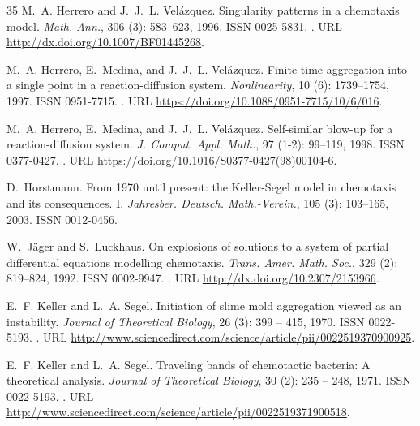 \documentclass[11pt]{aims}
\theoremstyle{definition}
\numberwithin{equation}{section}
\begin{document}
\begin{thebibliography}{35}
M.~A. Herrero and J.~J.~L. Vel{\'a}zquez.
\newblock Singularity patterns in a chemotaxis model.
\newblock \emph{Math. Ann.}, 306 (3): 583--623, 1996.
\newblock ISSN 0025-5831.
\newblock {}.
\newblock URL \url{http://dx.doi.org/10.1007/BF01445268}.

M.~A. Herrero, E.~Medina, and J.~J.~L. Vel\'{a}zquez.
\newblock Finite-time aggregation into a single point in a reaction-diffusion
  system.
\newblock \emph{Nonlinearity}, 10 (6): 1739--1754, 1997.
\newblock ISSN 0951-7715.
\newblock {}.
\newblock URL \url{https://doi.org/10.1088/0951-7715/10/6/016}.

M.~A. Herrero, E.~Medina, and J.~J.~L. Vel\'{a}zquez.
\newblock Self-similar blow-up for a reaction-diffusion system.
\newblock \emph{J. Comput. Appl. Math.}, 97 (1-2): 99--119,
  1998.
\newblock ISSN 0377-0427.
\newblock {}.
\newblock URL \url{https://doi.org/10.1016/S0377-0427(98)00104-6}.

D.~Horstmann.
\newblock From 1970 until present: the {K}eller-{S}egel model in chemotaxis and
  its consequences. {I}.
\newblock \emph{Jahresber. Deutsch. Math.-Verein.}, 105 (3):
  103--165, 2003.
\newblock ISSN 0012-0456.

W.~J{\"a}ger and S.~Luckhaus.
\newblock On explosions of solutions to a system of partial differential
  equations modelling chemotaxis.
\newblock \emph{Trans. Amer. Math. Soc.}, 329 (2): 819--824,
  1992.
\newblock ISSN 0002-9947.
\newblock {}.
\newblock URL \url{http://dx.doi.org/10.2307/2153966}.

E.~F. Keller and L.~A. Segel.
\newblock Initiation of slime mold aggregation viewed as an instability.
\newblock \emph{Journal of Theoretical Biology}, 26 (3): 399
  -- 415, 1970.
\newblock ISSN 0022-5193.
\newblock {}.
\newblock URL
  \url{http://www.sciencedirect.com/science/article/pii/0022519370900925}.

E.~F. Keller and L.~A. Segel.
\newblock Traveling bands of chemotactic bacteria: A theoretical analysis.
\newblock \emph{Journal of Theoretical Biology}, 30 (2): 235
  -- 248, 1971{}.
\newblock ISSN 0022-5193.
\newblock {}.
\newblock URL
  \url{http://www.sciencedirect.com/science/article/pii/0022519371900518}.


\end{thebibliography}
\end{document}
